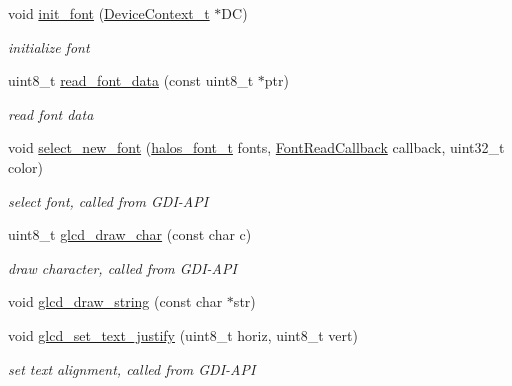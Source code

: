 \begin{CompactItemize}
\item 
void \hyperlink{group__graphic__device__font_ga343406213368d6304b31a9fce39c19d}{init\_\-font} (\hyperlink{struct_device_context__t}{DeviceContext\_\-t} $\ast$DC)
\begin{CompactList}\small\item\em initialize font \item\end{CompactList}\item 
uint8\_\-t \hyperlink{group__graphic__device__font_g56c9e56353b4b51cda195a17a23748ea}{read\_\-font\_\-data} (const uint8\_\-t $\ast$ptr)
\begin{CompactList}\small\item\em read font data \item\end{CompactList}\item 
void \hyperlink{group__graphic__device__font_g65f96d48c2f92aac9b7b71208826bdaf}{select\_\-new\_\-font} (\hyperlink{group__hgdi__fonts_gec86a33a52fa97333da1074389df46a3}{halos\_\-font\_\-t} fonts, \hyperlink{group__graphic__device__font_ge7d259c434193cdc93d4d4136d77612a}{FontReadCallback} callback, uint32\_\-t color)
\begin{CompactList}\small\item\em select font, called from GDI-API \item\end{CompactList}\item 
uint8\_\-t \hyperlink{group__graphic__device__font_ged8f749179799860fc51de0900f6460a}{glcd\_\-draw\_\-char} (const char c)
\begin{CompactList}\small\item\em draw character, called from GDI-API \item\end{CompactList}\item 
void \hyperlink{group__graphic__device__font_gcd9fe916d077689750b8db36268e97e5}{glcd\_\-draw\_\-string} (const char $\ast$str)
\item 
void \hyperlink{group__graphic__device__font_g526db8c9babc556c5a4cc0fca4375b57}{glcd\_\-set\_\-text\_\-justify} (uint8\_\-t horiz, uint8\_\-t vert)
\begin{CompactList}\small\item\em set text alignment, called from GDI-API \item\end{CompactList}\item 

\end{CompactItemize}
